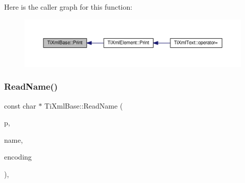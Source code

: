 Here is the caller graph for this function\+:
\nopagebreak
\begin{figure}[H]
\begin{center}
\leavevmode
\includegraphics[width=350pt]{class_ti_xml_base_a0de56b3f2ef14c65091a3b916437b512_icgraph}
\end{center}
\end{figure}
\mbox{\label{class_ti_xml_base_a1c21a6ab5f7b503acd91f35f183734b3}} 
\subsubsection{\texorpdfstring{Read\+Name()}{ReadName()}}
{\footnotesize\ttfamily const char $\ast$ Ti\+Xml\+Base\+::\+Read\+Name (\begin{DoxyParamCaption}\item[{const char $\ast$}]{p,  }\item[{\hyperlink{tinyxml_8h_a92bada05fd84d9a0c9a5bbe53de26887}{T\+I\+X\+M\+L\+\_\+\+S\+T\+R\+I\+NG} $\ast$}]{name,  }\item[{\hyperlink{tinyxml_8h_a88d51847a13ee0f4b4d320d03d2c4d96}{Ti\+Xml\+Encoding}}]{encoding }\end{DoxyParamCaption})\hspace{0.3cm}{\ttfamily [static]}, {\ttfamily [protected]}}

